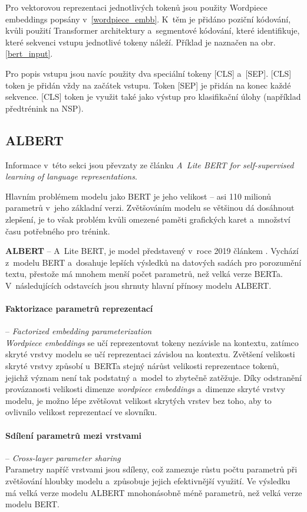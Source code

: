 Pro vektorovou reprezentaci jednotlivých tokenů jsou použity Wordpiece embeddings \cite{wordpiece} popsány v~\ref{wordpiece_embb}. K~těm je přidáno poziční kódování, kvůli použití Transformer architektury a~segmentové kódování, které identifikuje, které sekvenci vstupu jednotlivé tokeny náleží. Příklad je naznačen na obr. \ref{bert_input}.\par
Pro popis vstupu jsou navíc použity dva speciální tokeny [CLS] a~[SEP]. [CLS] token je přidán vždy na začátek vstupu. Token [SEP] je přidán na konec každé sekvence. [CLS] token je využit také jako výstup pro klasifikační úlohy (například předtrénink na NSP).

\subsection{ALBERT}
Informace v~této sekci jsou převzaty ze článku \cite{ALBERT} \emph{A~Lite BERT for self-supervised learning of language representations}.\par
Hlavním problémem modelu jako BERT je jeho velikost -- asi 110 milionů parametrů v~jeho základní verzi. Zvětšováním modelu se většinou dá dosáhnout zlepšení, je to však problém kvůli omezené paměti grafických karet a~množství času potřebného pro trénink.\par
\textbf{ALBERT} -- A~Lite BERT, je model představený v~roce 2019 článkem \cite{ALBERT}. Vychází z~modelu BERT a~dosahuje lepších výsledků na datových sadách pro porozumění textu, přestože má mnohem menší počet parametrů, než velká verze BERTa. V~následujících odstavcích jsou shrnuty hlavní přínosy modelu ALBERT.

\paragraph{Faktorizace parametrů reprezentací} -- \emph{Factorized embedding parameterization}\\ 
\emph{Wordpiece embeddings} se učí reprezentovat tokeny nezávisle na kontextu, zatímco skryté vrstvy modelu se učí reprezentaci závislou na kontextu. Zvětšení velikosti skryté vrstvy způsobí u~BERTa stejný nárůst velikosti reprezentace tokenů, jejichž význam není tak podstatný a~model to zbytečně zatěžuje.
Díky odstranění provázanosti velikosti dimenze \emph{wordpiece embeddings} a~dimenze skryté vrstvy modelu, je možno lépe zvětšovat velikost skrytých vrstev bez toho, aby to ovlivnilo velikost reprezentací ve slovníku.

\paragraph{Sdílení parametrů mezi vrstvami} -- \textit{Cross-layer parameter sharing}\\
Parametry napříč vrstvami jsou sdíleny, což zamezuje růstu počtu parametrů při zvětšování hloubky modelu a~způsobuje jejich efektivnější využití. Ve výsledku má velká verze modelu ALBERT mnohonásobně méně parametrů, než velká verze modelu BERT.

